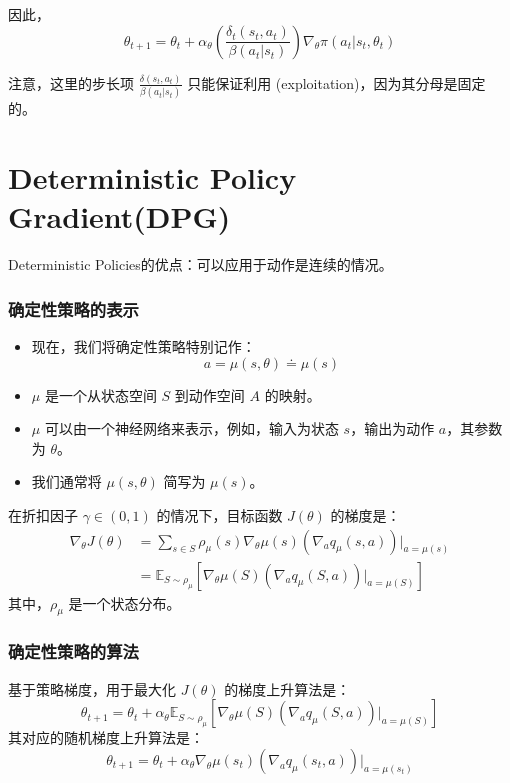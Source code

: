 \documentclass{article}
\begin{document}
因此，
\[
\theta_{t+1} = \theta_t + \alpha_{\theta} \left( \frac{\delta_t(s_t, a_t)}{\beta(a_t|s_t)} \right) \nabla_{\theta} \pi(a_t|s_t, \theta_t)
\]

注意，这里的步长项 $\frac{\delta(s_t, a_t)}{\beta(a_t|s_t)}$ 只能保证利用 (exploitation)，因为其分母是固定的。

\section{Deterministic Policy Gradient(DPG)}
Deterministic Policies的优点：可以应用于动作是连续的情况。
\subsubsection*{确定性策略的表示}
\begin{itemize}
    \item 现在，我们将确定性策略特别记作：
    \[
    a = \mu(s, \theta) \doteq \mu(s)
    \]
    \item $\mu$ 是一个从状态空间 $S$ 到动作空间 $A$ 的映射。
    \item $\mu$ 可以由一个神经网络来表示，例如，输入为状态 $s$，输出为动作 $a$，其参数为 $\theta$。
    \item 我们通常将 $\mu(s, \theta)$ 简写为 $\mu(s)$。
\end{itemize}

在折扣因子 $\gamma \in (0, 1)$ 的情况下，目标函数 $J(\theta)$ 的梯度是：
\begin{align*}
\nabla_{\theta} J(\theta) &= \sum_{s \in S} \rho_{\mu}(s) \nabla_{\theta} \mu(s) (\nabla_a q_{\mu}(s, a))|_{a=\mu(s)} \\
&= \mathbb{E}_{S \sim \rho_{\mu}}[\nabla_{\theta} \mu(S) (\nabla_a q_{\mu}(S, a))|_{a=\mu(S)}]
\end{align*}
其中，$\rho_{\mu}$ 是一个状态分布。

\subsubsection*{确定性策略的算法}
基于策略梯度，用于最大化 $J(\theta)$ 的梯度上升算法是：
\[
\theta_{t+1} = \theta_t + \alpha_{\theta} \mathbb{E}_{S \sim \rho_{\mu}}[\nabla_{\theta} \mu(S)(\nabla_a q_{\mu}(S, a))|_{a=\mu(S)}]
\]
其对应的随机梯度上升算法是：
\[
\theta_{t+1} = \theta_t + \alpha_{\theta} \nabla_{\theta} \mu(s_t)(\nabla_a q_{\mu}(s_t, a))|_{a=\mu(s_t)}
\]
\end{document}
